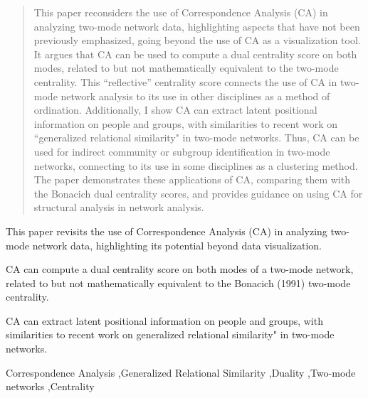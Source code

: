 \documentclass[a4paper,fleqn]{cas-sc}
\begin{document}
\begin{abstract}
This paper reconsiders the use of Correspondence Analysis (CA) in analyzing two-mode network data, highlighting aspects that have not been previously emphasized, going beyond the use of CA as a visualization tool. It argues that CA can be used to compute a dual centrality score on both modes, related to but not mathematically equivalent to the \citet{bonacich1991simultaneous} two-mode centrality. This ``reflective'' centrality score connects the use of CA in two-mode network analysis to its use in other disciplines as a method of ordination. Additionally, I show CA can extract latent positional information on people and groups, with similarities to recent work on ``generalized relational similarity" in two-mode networks. Thus, CA can be used for indirect community or subgroup identification in two-mode networks, connecting to its use in some disciplines as a clustering method. The paper demonstrates these applications of CA, comparing them with the Bonacich dual centrality scores, and provides guidance on using CA for structural analysis in network analysis.
\end{abstract}


\begin{highlights}
  \item This paper revisits the use of Correspondence Analysis (CA) in analyzing two-mode network data, highlighting its potential beyond data visualization.
  \item CA can compute a dual centrality score on both modes of a two-mode network, related to but not mathematically equivalent to the Bonacich (1991) two-mode centrality. 
  \item CA can extract latent positional information on people and groups, with similarities to recent work on generalized relational similarity" in two-mode networks. 
\end{highlights}

\begin{keywords}
Correspondence Analysis \sep Generalized Relational Similarity \sep Duality \sep Two-mode networks \sep Centrality 
\end{keywords}
\end{document}
